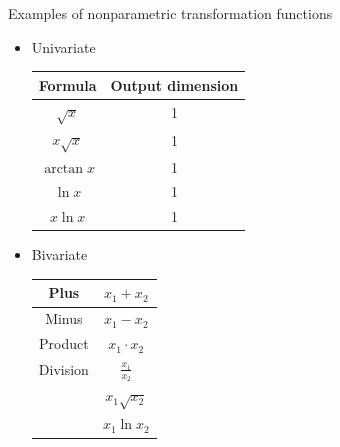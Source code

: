 \documentclass{beamer}
\begin{document}
\begin{frame}{Examples of nonparametric transformation functions}

\begin{itemize}
\item Univariate \quad
\begin{tabular}{c|c}
Formula		&	Output dimension	\\ \hline
$	\sqrt{x}	$	&	1		\\ \hline
$	x\sqrt{x}	$	&	1		\\ \hline
$	\arctan{x}	$	&	1		\\ \hline
$	\ln{x}	$	&	1	\\ \hline
$	x\ln{x}	$	&	1	\\
\end{tabular}

\medskip
\item Bivariate \quad
\begin{tabular}{c|c}
Plus	&	$	x_1 + x_2	$	\\ \hline
Minus	&	$	x_1 - x_2	$	\\ \hline
Product	&	$	x_1 \cdot x_2	$	\\ \hline
Division	&	$	\frac{x_1}{x_2}	$	\\ \hline
	&	$	x_1\sqrt{x_2}	$	\\ \hline
	&	$	x_1\ln{x_2}	$	\\
\end{tabular}

\end{itemize}

\end{frame}
\end{document}
